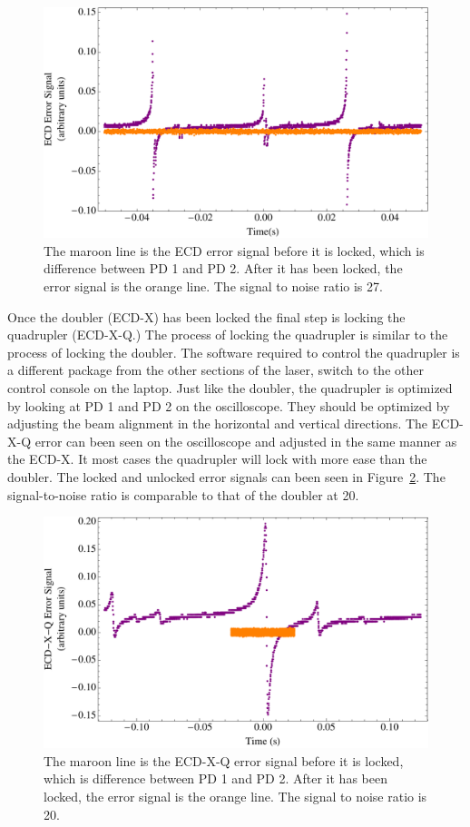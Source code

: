 \documentclass[prb,preprint]{revtex4-1}
\begin{document}
\begin{figure}[h!]
\centering
\includegraphics[width=6in]{ECDError.pdf}
\caption{The maroon line is the ECD error signal before it is locked, which is difference between PD 1 and PD 2. After it has been locked, the error signal is the orange line. The signal to noise ratio is 27.}
\label{ECDError}
\end{figure}

Once the doubler (ECD-X) has been locked the final step is locking the quadrupler (ECD-X-Q.) The process of locking the quadrupler is similar to the process of locking the doubler. The software required to control the quadrupler is a different package from the other sections of the laser, switch to the other control console on the laptop. Just like the doubler, the quadrupler is optimized by looking at PD 1 and PD 2 on the oscilloscope. They should be optimized by adjusting the beam alignment in the horizontal and vertical directions. The ECD-X-Q error can been seen on the oscilloscope and adjusted in the same manner as the ECD-X. It most cases the quadrupler will lock with more ease than the doubler. The locked and unlocked error signals can been seen in Figure~\ref{ECDQError}. The signal-to-noise ratio is comparable to that of the doubler at 20.

\begin{figure}[h!]
\centering
\includegraphics[width=6in]{ECDQError.pdf}
\caption{The maroon line is the ECD-X-Q error signal before it is locked, which is difference between PD 1 and PD 2. After it has been locked, the error signal is the orange line. The signal to noise ratio is 20.}
\label{ECDQError}
\end{figure}
\end{document}
